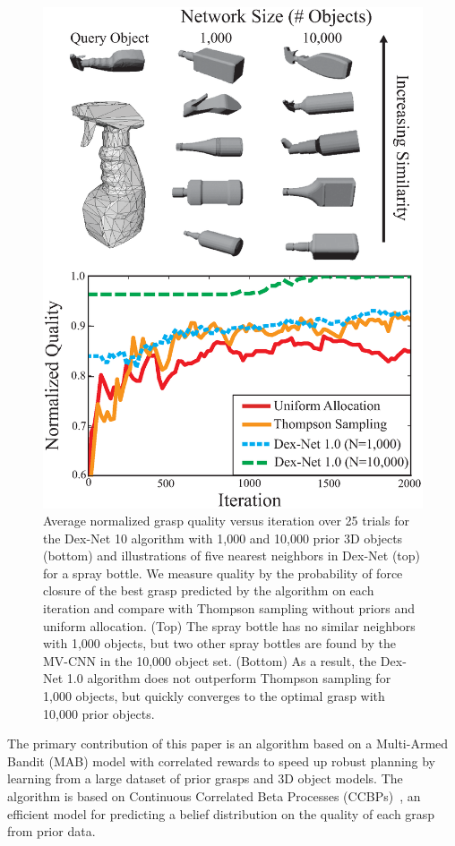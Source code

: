 \begin{figure}[t!]
\centering
\includegraphics[scale=0.45]{figures/illustrations/spray_bottle_avg_reward_w_neighbors.eps}
\caption{Average normalized grasp quality versus iteration over 25 trials for the Dex-Net 10 algorithm with 1,000 and 10,000 prior 3D objects (bottom) and illustrations of five nearest neighbors in Dex-Net (top) for a spray bottle. We measure quality by the probability of force closure of the best grasp predicted by the algorithm on each iteration and compare with Thompson sampling without priors and uniform allocation. (Top) The spray bottle has no similar neighbors with 1,000 objects, but two other spray bottles are found by the MV-CNN in the 10,000 object set. (Bottom) As a result, the Dex-Net 1.0 algorithm does not outperform Thompson sampling for 1,000 objects, but quickly converges to the optimal grasp with 10,000 prior objects.}
\vspace*{-20pt}
\end{figure}
The primary contribution of this paper is an algorithm based on a Multi-Armed Bandit (MAB) model with correlated rewards to speed up robust planning by learning from a large dataset of prior grasps and 3D object models.
The algorithm is based on Continuous Correlated Beta Processes (CCBPs)~\cite{goetschalckx2011continuous, montesano2012active}, an efficient model for predicting a belief distribution on the quality of each grasp from prior data.

